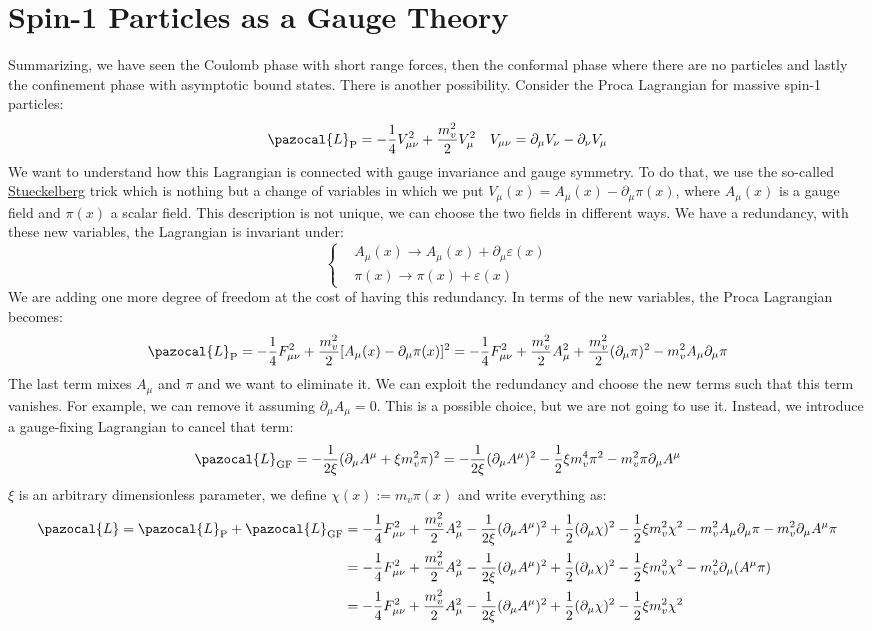 \documentclass[../main.tex]{subfiles}
\begin{document}
\section{Spin-1 Particles as a Gauge Theory}
Summarizing, we have seen the Coulomb phase with short range forces, then the conformal phase where there are no particles and lastly the confinement phase with asymptotic bound states. There is another possibility. Consider the Proca Lagrangian for massive spin-1 particles:
\[
\pazocal{L}_{\text{P}}=-\frac{1}{4}V_{\mu\nu}^2+\frac{m_v^2}{2}V_\mu^2 \quad V_{\mu\nu}=\partial_\mu V_\nu-\partial_\nu V_\mu
\]
We want to understand how this Lagrangian is connected with gauge invariance and gauge symmetry. To do that, we use the so-called \href{https://en.wikipedia.org/wiki/Ernst_Stueckelberg}{Stueckelberg} trick which is nothing but a change of variables in which we put $V_\mu(x)=A_\mu(x)-\partial_\mu\pi(x)$, where $A_\mu(x)$ is a gauge field and $\pi(x)$  a scalar field. This description is not unique, we can choose the two fields in different ways. We have a redundancy, with these new variables, the Lagrangian is invariant under:
\[
\left\{
\begin{aligned}
&A_\mu(x)\to A_\mu(x)+\partial_\mu\varepsilon(x)\\
&\pi(x)\to\pi(x)+\varepsilon(x)
\end{aligned}
\right.
\]
We are adding one more degree of freedom at the cost of having this redundancy. In terms of the new variables, the Proca Lagrangian becomes:
\[
\pazocal{L}_{\text{P}}=-\frac{1}{4}F_{\mu\nu}^2+\frac{m_v^2}{2}[A_\mu(x)-\partial_\mu\pi(x)]^2=-\frac{1}{4}F_{\mu\nu}^2+\frac{m_v^2}{2}A^2_\mu+\frac{m_v^2}{2}(\partial_\mu\pi)^2-m_v^2A_\mu\partial_\mu\pi
\]
The last term mixes $A_\mu$ and $\pi$ and we want to eliminate it. We can exploit the redundancy and choose the new terms such that this term vanishes. For example, we can remove it assuming $\partial_\mu A_\mu=0$. This is a possible choice, but we are not going to use it. Instead, we introduce a gauge-fixing Lagrangian to cancel that term:
\[
\pazocal{L}_{\text{GF}}=-\frac{1}{2\xi}(\partial_\mu A^\mu+\xi m_v^2\pi)^2=-\frac{1}{2\xi}(\partial_\mu A^\mu)^2-\frac{1}{2}\xi m_v^4\pi^2-m_v^2\pi\partial_\mu A^\mu
\]
$\xi$ is an arbitrary dimensionless parameter, we define $\chi(x):=m_v\pi(x)$ and write everything as:
\begin{align*}
\pazocal{L}=\pazocal{L}_{\text{P}}+\pazocal{L}_{\text{GF}}&=-\frac{1}{4}F_{\mu\nu}^2+\frac{m_v^2}{2}A_\mu^2-\frac{1}{2\xi}(\partial_\mu A^\mu)^2+\frac{1}{2}(\partial_\mu\chi)^2-\frac{1}{2}\xi m_v^2\chi^2-m_v^2A_\mu\partial_\mu\pi-m_v^2\partial_\mu A^\mu\pi\\
&=-\frac{1}{4}F_{\mu\nu}^2+\frac{m_v^2}{2}A_\mu^2-\frac{1}{2\xi}(\partial_\mu A^\mu)^2+\frac{1}{2}(\partial_\mu\chi)^2-\frac{1}{2}\xi m_v^2\chi^2-m_v^2\partial_\mu(A^\mu\pi)\\
&=-\frac{1}{4}F_{\mu\nu}^2+\frac{m_v^2}{2}A_\mu^2-\frac{1}{2\xi}(\partial_\mu A^\mu)^2+\frac{1}{2}(\partial_\mu\chi)^2-\frac{1}{2}\xi m_v^2\chi^2
\end{align*}
\end{document}
